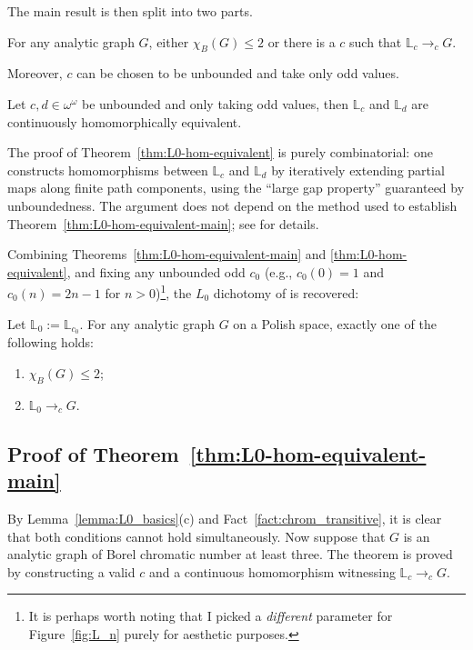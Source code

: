 The main result is then split into two parts.

\begin{theorem}\label{thm:L0-hom-equivalent-main}
    For any analytic graph $G$, either $\chi_B(G)\leq 2$ or there is a $c$ such that $\mathbb L_c\to_cG$.
\end{theorem}

Moreover, $c$ can be chosen to be unbounded and take only odd values.

\begin{theorem}\label{thm:L0-hom-equivalent}
    Let $c,d\in\omega^\omega$ be unbounded and only taking odd values, then $\mathbb L_c$ and $\mathbb L_d$ are continuously homomorphically equivalent.
\end{theorem}

The proof of Theorem~\ref{thm:L0-hom-equivalent} is purely combinatorial: one constructs homomorphisms between $\mathbb L_c$ and $\mathbb L_d$ by iteratively extending partial maps along finite path components, using the ``large gap property'' guaranteed by unboundedness.
The argument does not depend on the method used to establish Theorem~\ref{thm:L0-hom-equivalent-main}; see \cite[Proposition~4.2 and Claim~4.1]{L0paper} for details.

Combining Theorems~\ref{thm:L0-hom-equivalent-main} and \ref{thm:L0-hom-equivalent}, and fixing any unbounded odd $c_0$ (e.g., $c_0(0)=1$ and $c_0(n)=2n-1$ for $n>0$)\footnote{It is perhaps worth noting that I picked a \emph{different} parameter for Figure~\ref{fig:L_n} purely for aesthetic purposes.}, the $L_0$ dichotomy of \cite{L0paper} is recovered:

\begin{corollary}
    Let $\mathbb L_0:=\mathbb L_{c_0}$.
    For any analytic graph $G$ on a Polish space, exactly one of the following holds:
    \begin{enumerate}[label=(\alph*)]
        \item $\chi_B(G)\leq 2$;
        \item $\mathbb L_0\to_cG$.
    \end{enumerate}
\end{corollary}

\subsection{Proof of Theorem~\ref{thm:L0-hom-equivalent-main}}

By Lemma~\ref{lemma:L0_basics}(c) and Fact~\ref{fact:chrom_transitive}, it is clear that both conditions cannot hold simultaneously.
Now suppose that $G$ is an analytic graph of Borel chromatic number at least three.
The theorem is proved by constructing a valid $c$ and a continuous homomorphism witnessing $\mathbb L_c\to_cG$.

